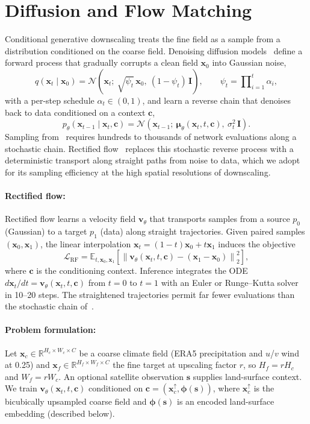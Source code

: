 \documentclass[letterpaper,withtimes]{easychair}
\newcommand{\E}{\mathbb{E}}
\newcommand{\Eb}[2]{\E_{#1}\!\left[#2\right]}
\newcommand{\R}{\mathbb{R}}
\newcommand{\norm}[1]{\left\|#1\right\|}
\newcommand{\bI}{\mathbf{I}}
\newcommand{\bc}{\mathbf{c}}
\newcommand{\bs}{\mathbf{s}}
\newcommand{\bv}{\mathbf{v}}
\newcommand{\bx}{\mathbf{x}}
\newcommand{\bmu}{{\boldsymbol{\mu}}}
\newcommand{\bphi}{{\boldsymbol{\phi}}}
\begin{document}
\section{Diffusion and Flow Matching}
\label{sec:background}
Conditional generative downscaling treats the fine field as a sample from a distribution conditioned on the coarse field. Denoising diffusion models~\citep{ho2020denoising,song2021score} define a forward process that gradually corrupts a clean field $\bx_0$ into Gaussian noise,
\begin{equation}
q(\bx_t \mid \bx_0) = \mathcal{N}\!\left(\bx_t;\ \sqrt{\psi_t}\,\bx_0,\ (1-\psi_t)\,\bI\right), \qquad \psi_t = \prod\nolimits_{i=1}^{t}\alpha_i,
\label{eq:fwd}
\end{equation}
with a per-step schedule $\alpha_t \in (0,1)$, and learn a reverse chain that denoises back to data conditioned on a context $\bc$,
\begin{equation}
p_\theta(\bx_{t-1} \mid \bx_t, \bc) = \mathcal{N}\!\left(\bx_{t-1};\ \bmu_\theta(\bx_t, t, \bc),\ \sigma_t^2\,\bI\right).
\label{eq:rev}
\end{equation}
Sampling from~ requires hundreds to thousands of network evaluations along a stochastic chain. Rectified flow~\citep{liu2022flow,lipman2022flow} replaces this stochastic reverse process with a deterministic transport along straight paths from noise to data, which we adopt for its sampling efficiency at the high spatial resolutions of downscaling.

\paragraph{Rectified flow:}
Rectified flow learns a velocity field $\bv_\theta$ that transports samples from a source $p_0$ (Gaussian) to a target $p_1$ (data) along straight trajectories. Given paired samples $(\bx_0,\bx_1)$, the linear interpolation $\bx_t = (1-t)\bx_0 + t\bx_1$ induces the objective
\begin{equation}
\mathcal{L}_{\mathrm{RF}} = \Eb{t, \bx_0, \bx_1}{ \norm{ \bv_\theta(\bx_t, t, \bc) - (\bx_1 - \bx_0) }_2^2 },
\label{eq:rf}
\end{equation}
where $\bc$ is the conditioning context. Inference integrates the ODE $d\bx_t/dt = \bv_\theta(\bx_t, t, \bc)$ from $t{=}0$ to $t{=}1$ with an Euler or Runge--Kutta solver in 10--20 steps. The straightened trajectories permit far fewer evaluations than the stochastic chain of~.

\paragraph{Problem formulation:}
Let $\bx_c \in \R^{H_c \times W_c \times C}$ be a coarse climate field (ERA5 precipitation and $u$/$v$ wind at 0.25\textdegree) and $\bx_f \in \R^{H_f \times W_f \times C}$ the fine target at upscaling factor $r$, so $H_f = r H_c$ and $W_f = r W_c$. An optional satellite observation $\bs$ supplies land-surface context. We train $\bv_\theta(\bx_t, t, \bc)$ conditioned on $\bc = (\bx_c^{\uparrow}, \bphi(\bs))$, where $\bx_c^{\uparrow}$ is the bicubically upsampled coarse field and $\bphi(\bs)$ is an encoded land-surface embedding (described below).
\end{document}
